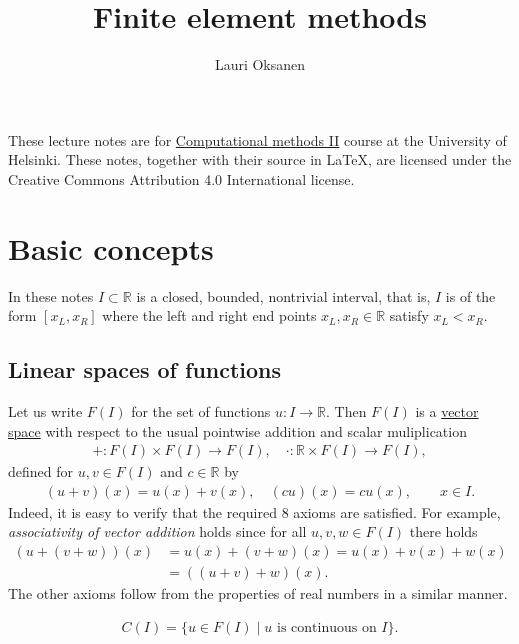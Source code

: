 \documentclass[12pt,oneside]{amsart}
\title{Finite element methods}
\author{Lauri Oksanen}
\def\R{\mathbb R}
\begin{document}
\maketitle

These lecture notes are for 
\href{https://studies.helsinki.fi/courses/cu/hy-CU-141575726-2020-08-01}{Computational methods II} course at the University of Helsinki. 
These notes, together with their source in \LaTeX,
are licensed under the Creative Commons Attribution 4.0 International license.

\tableofcontents

\section{Basic concepts}

In these notes $I \subset \R$ is a closed, bounded, nontrivial interval, that is, $I$ is of the form $[x_L, x_R]$
where the left and right end points $x_L, x_R \in \R$ satisfy $x_L < x_R$. 

\subsection{Linear spaces of functions}

Let us write $F(I)$ for the set of functions $u : I \to \mathbb R$. Then $F(I)$ is a 
\href{https://en.wikipedia.org/wiki/Vector_space#Notation_and_definition}{vector space} with respect to the usual pointwise addition and scalar muliplication
    \begin{align*}
+ : F(I) \times F(I) \to F(I), \quad \cdot : \mathbb R \times F(I) \to F(I),
    \end{align*}
defined for $u,v \in F(I)$ and $c \in \mathbb R$ by
    \begin{align*}
(u + v)(x) = u(x) + v(x), \quad (cu)(x) = cu(x), \qquad x \in I.
    \end{align*}
Indeed, it is easy to verify that the required 8 axioms are satisfied. For example, {\em associativity of vector addition} holds since for all $u,v,w \in F(I)$ there holds
    \begin{align*}
(u + (v + w))(x) 
&= 
u(x) + (v+w)(x) 
= 
u(x) + v(x) + w(x) 
\\&= 
((u + v) + w)(x).
    \end{align*}
The other axioms follow from the properties of real numbers in a similar manner.

\begin{definition}
    \begin{align*}
C(I) = \{ u \in F(I) \mid \text{$u$ is continuous on $I$}\}.
    \end{align*}
\end{definition}
\end{document}
